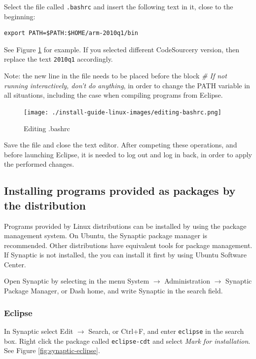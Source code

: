 \documentclass[a4paper, 10pt]{article}
\begin{document}
Select the file called \verb+.bashrc+ and insert the following text in it,
close to the beginning:

\begin{verbatim}
export PATH=$PATH:$HOME/arm-2010q1/bin
\end{verbatim}

See Figure \ref{fig:editing-bashrc} for example. If you selected different CodeSourcery version,
then replace the text \verb+2010q1+ accordingly.

Note: the new line in the file needs to be placed before the block
\emph{\# If not running interactively, don't do anything},
in order to change the PATH variable in all situations,
including the case when compiling programs from Eclipse.

    \begin{figure}[H]
    \centering
        \texttt{[image: ./install-guide-linux-images/editing-bashrc.png]}
        \caption{Editing .bashrc}
        \label{fig:editing-bashrc}
    \end{figure}

Save the file and close the text editor.
After competing these operations, and before launching Eclipse, it is needed to
log out and log in back, in order to apply the performed changes.

\subsection{Installing programs provided as packages by the distribution}

Programs provided by Linux distributions can be installed by using the package management system.
On Ubuntu, the Synaptic package manager is recommended.
Other distributions have equivalent tools for package management.
If Synaptic is not installed, the you can install it first by using
Ubuntu Software Center.

Open Synaptic by selecting in the menu System $\rightarrow$ Administration $\rightarrow$
Synaptic Package Manager,
or Dash home, and write Synaptic in the search field.

\subsubsection{Eclipse}

In Synaptic select Edit $\rightarrow$ Search, or Ctrl+F, and enter \verb+eclipse+
in the search box. Right click the package called
\verb+eclipse-cdt+ and select \emph{Mark for installation}.
See Figure \ref{fig:synaptic-eclipse}.
\end{document}
